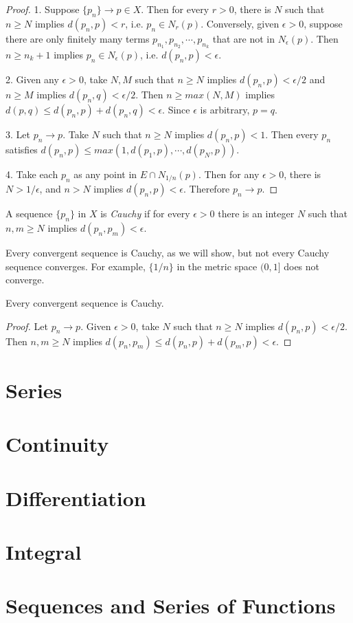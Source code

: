     \begin{proof}
        1. Suppose $\{p_n\} \rightarrow p \in X$. Then for every $r > 0$, there is $N$ such that $n \geq N$ implies $d(p_n, p) < r$, i.e. $p_n \in N_r(p)$. Conversely, given $\epsilon > 0$, suppose there are only finitely many terms $p_{n_1}, p_{n_2}, \cdots, p_{n_k}$ that are not in $N_\epsilon (p)$. Then $n \geq n_k+1$ implies $p_n \in N_\epsilon (p)$, i.e. $d(p_n, p) < \epsilon$.
        
        2. Given any $\epsilon > 0$, take $N, M$ such that $n \geq N$ implies $d(p_n, p) < \epsilon / 2$ and $n \geq M$ implies $d(p_n, q) < \epsilon / 2$. Then $n \geq max(N,M)$ implies $d(p,q) \leq d(p_n,p) + d(p_n,q) < \epsilon$. Since $\epsilon$ is arbitrary, $p=q$.
        
        3. Let $p_n \rightarrow p$. Take $N$ such that $n \geq N$ implies $d(p_n, p) < 1$. Then every $p_n$ satisfies $d(p_n, p) \leq max(1, d(p_1,p), \cdots, d(p_N,p))$.
        
        4. Take each $p_n$ as any point in $E \cap N_{1/n}(p)$. Then for any $\epsilon > 0$, there is $N > 1/\epsilon$, and $n > N$ implies $d(p_n, p) < \epsilon$. Therefore $p_n \rightarrow p$.
    \end{proof}
    
    \begin{defn} \label{def_analysis_cauchy}
        A sequence $\{p_n\}$ in $X$ is \emph{Cauchy} if for every $\epsilon > 0$ there is an integer $N$ such that $n,m \geq N$ implies $d(p_n,p_m) < \epsilon$.
    \end{defn}
    
    Every convergent sequence is Cauchy, as we will show, but not every Cauchy sequence converges. For example, $\{1/n\}$ in the metric space $(0,1]$ does not converge.
    
    \begin{prop} \label{prop_analysis_convcauchy}
        Every convergent sequence is Cauchy.
    \end{prop}
    
    \begin{proof}
        Let $p_n \rightarrow p$. Given $\epsilon > 0$, take $N$ such that $n \geq N$ implies $d(p_n, p) < \epsilon / 2$. Then $n,m \geq N$ implies $d(p_n, p_m) \leq d(p_n,p) + d(p_m,p) < \epsilon$.
    \end{proof}
    
    \section{Series}
    
    \section{Continuity}
    
    \section{Differentiation}
    
    \section{Integral}
    
    \section{Sequences and Series of Functions}

